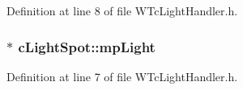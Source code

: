 Definition at line 8 of file WTcLightHandler.h.

\hypertarget{classc_light_spot_ab46df08134a9fdcd89db80b9f023cf52}{
\subsubsection[{mpLight}]{$\ast$ {\bf cLightSpot::mpLight}}}
\label{classc_light_spot_ab46df08134a9fdcd89db80b9f023cf52}


Definition at line 7 of file WTcLightHandler.h.

